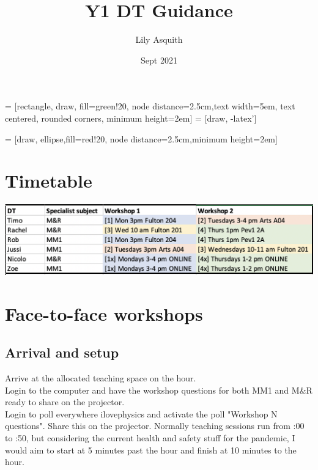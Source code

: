 \documentclass[11.5pt,sans,english]{article}
\title{Y1 DT Guidance}
\author{Lily Asquith}
\date{Sept 2021}
\begin{document}
 = [rectangle, draw, fill=green!20,  node distance=2.5cm,text width=5em, text centered, rounded corners, minimum height=2em]
 = [draw, -latex']

 = [draw, ellipse,fill=red!20, node distance=2.5cm,minimum height=2em]
    
    
    

%
%
%


\section{Timetable}

\includegraphics[scale=0.6]{DT-timetable}

\section{Face-to-face workshops}

\subsection{Arrival and setup}
Arrive at the allocated teaching space on the hour.\\
Login to the computer and have the  workshop questions for both MM1 and M\&R ready to share on the projector.\\
Login to poll everywhere ilovephysics and activate the poll "Workshop N questions". Share this on the projector.
Normally teaching sessions run from :00 to :50, but considering the current health and safety stuff for the pandemic, I would aim to start at 5 minutes past the hour and finish at 10 minutes to the hour.\\
\end{document}
